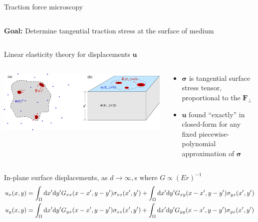 \documentclass[presentation,aspectratio=169]{beamer}
\newcommand{\dd}{\mathrm{d}}
\newcommand{\bsigma}{\boldsymbol\sigma}
\begin{document}
\begin{frame}{Traction force microscopy}
\begin{columns}
\begin{column}{0.55\textwidth}
\bigskip

\textbf{Goal:} Determine tangential traction stress at the surface of medium

\end{column}
\end{columns}
\end{frame}

\begin{frame}{Linear elasticity theory for displacements $\mathbf{u}$}
\begin{columns}
\begin{column}{0.65\textwidth}
\centering
\includegraphics[width=\textwidth]{figures/Fig1}
\end{column}
\begin{column}{0.35\textwidth}
\begin{itemize}
\item $\bsigma$ is tangential surface stress tensor, proportional to the $\mathbf{F}_\perp$
\item $\mathbf{u}$ found ``exactly'' in closed-form for any fixed piecewise-polynomial approximation of $\bsigma$
\end{itemize}
\end{column}
\end{columns}

\scriptsize

\begin{block}{In-plane surface displacements, as $d\to\infty,$s where $G \propto (Er)^{-1}$}
\vspace{-10pt}
\begin{align*}\tiny
u_{x}(x,y) &= \int_\Omega \dd x'\dd y'G_{xx}( x-x',y-y')\sigma_{xz}(x',y') 
 +  \int_\Omega \dd x'\dd y'G_{xy}( x-x',y-y')\sigma_{yz}(x',y')  \\
u_y(x,y) &= \int_\Omega \dd x'\dd y'G_{yx}( x-x',y-y')\sigma_{xz}(x',y') +  \int_\Omega \dd x'\dd y'G_{yy}( x-x',y-y')\sigma_{yz}(x',y') 
\end{align*}
\end{block}

\end{frame}
\end{document}
